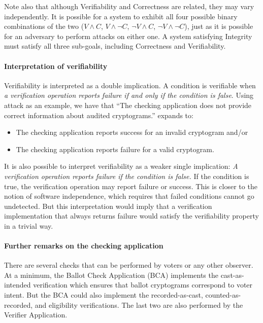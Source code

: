 \documentclass[10pt,letterpaper]{article}
\begin{document}
Note also that although Verifiability and Correctness are related, they may vary independently. It is possible for a system to exhibit all four possible binary combinations of the two ($V\wedge C$, $V\wedge\neg C$, $\neg V\wedge C$, $\neg V\wedge \neg C$), just as it is possible for an adversary to perform attacks on either one. A system satisfying Integrity must satisfy all three sub-goals, including Correctness and Verifiability.





\paragraph{Interpretation of verifiability}

Verifiability is interpreted as a double implication. A condition is verifiable when \emph{a verification operation reports failure if and only if the condition is false}. Using attack \RefNumATKCheatingBallotCheckingApplication{} as an example, we have that ``The checking application does not provide correct information about audited cryptograms.'' expands to:
%
\begin{itemize}
    \item The checking application reports success for an invalid cryptogram and/or
    \item The checking application reports failure for a valid cryptogram.
\end{itemize}

It is also possible to interpret verifiability as a weaker single implication: \emph{A verification operation reports failure if the condition is false.}
%
If the condition is true, the verification operation may report failure or success. This is closer to the notion of software independence, which requires that failed conditions cannot go undetected. But this interpretation would imply that a verification implementation that always returns failure would satisfy the verifiability property in a trivial way.

\hypertarget{further-remarks-checking-application}{\paragraph{Further remarks on the checking application}}
There are several checks that can be performed by voters or any other observer. At a minimum, the Ballot Check Application (BCA) implements the cast-as-intended verification which ensures that ballot cryptograms correspond to voter intent. But the BCA could also implement the recorded-as-cast, counted-as-recorded, and eligibility verifications. The last two are also performed by the Verifier Application.
\end{document}
